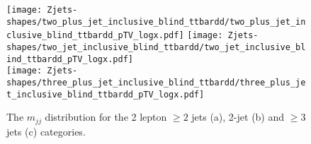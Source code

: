 \begin{figure}[!htb]
  \centering
  \texttt{[image: Zjets-shapes/two\_plus\_jet\_inclusive\_blind\_ttbardd/two\_plus\_jet\_inclusive\_blind\_ttbardd\_pTV\_logx.pdf]}
  \texttt{[image: Zjets-shapes/two\_jet\_inclusive\_blind\_ttbardd/two\_jet\_inclusive\_blind\_ttbardd\_pTV\_logx.pdf]} \\
  \texttt{[image: Zjets-shapes/three\_plus\_jet\_inclusive\_blind\_ttbardd/three\_plus\_jet\_inclusive\_blind\_ttbardd\_pTV\_logx.pdf]}
  \caption{The $m_{jj}$ distribution for the 2 lepton $\geq 2$ jets (a), 2-jet
    (b) and $\ge 3$ jets (c) categories.}
  \label{fig:2lepmbb_model}
\end{figure}